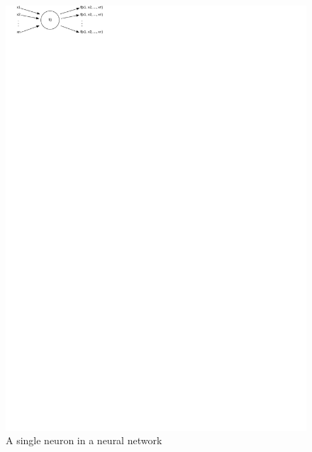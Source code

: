 \documentclass{article}
\begin{document}
\begin{figure}
  \includegraphics[scale=1]{neuron}
  \caption{A single neuron in a neural network}
  \label{fig:neuron}
\end{figure}
\end{document}
